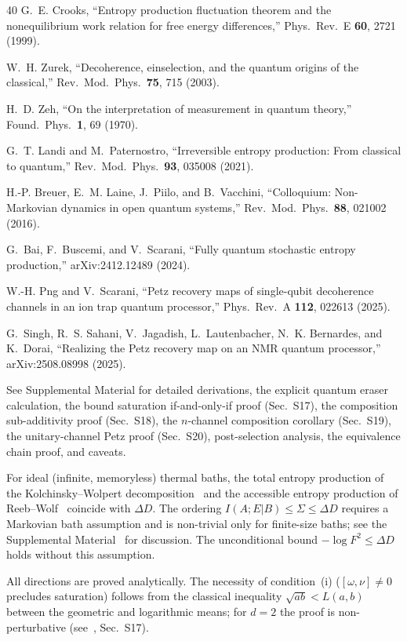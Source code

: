 \documentclass[prl,twocolumn,superscriptaddress,longbibliography,floatfix]{revtex4-2}
\begin{document}
\begin{thebibliography}{40}
G.~E. Crooks,
``Entropy production fluctuation theorem and the nonequilibrium
work relation for free energy differences,''
Phys.\ Rev.\ E \textbf{60}, 2721 (1999).

W.~H. Zurek,
``Decoherence, einselection, and the quantum origins of the
classical,''
Rev.\ Mod.\ Phys.\ \textbf{75}, 715 (2003).

H.~D. Zeh,
``On the interpretation of measurement in quantum theory,''
Found.\ Phys.\ \textbf{1}, 69 (1970).

G.~T. Landi and M.~Paternostro,
``Irreversible entropy production: From classical to quantum,''
Rev.\ Mod.\ Phys.\ \textbf{93}, 035008 (2021).

H.-P. Breuer, E.~M. Laine, J.~Piilo, and B.~Vacchini,
``Colloquium: Non-Markovian dynamics in open quantum systems,''
Rev.\ Mod.\ Phys.\ \textbf{88}, 021002 (2016).

G.~Bai, F.~Buscemi, and V.~Scarani,
``Fully quantum stochastic entropy production,''
arXiv:2412.12489 (2024).

W.-H. Png and V.~Scarani,
``Petz recovery maps of single-qubit decoherence channels in an
ion trap quantum processor,''
Phys.\ Rev.\ A \textbf{112}, 022613 (2025).

G.~Singh, R.~S. Sahani, V.~Jagadish, L.~Lautenbacher,
N.~K. Bernardes, and K.~Dorai,
``Realizing the Petz recovery map on an NMR quantum processor,''
arXiv:2508.08998 (2025).

See Supplemental Material for detailed derivations,
the explicit quantum eraser calculation, the bound saturation
if-and-only-if proof (Sec.~S17), the composition sub-additivity
proof (Sec.~S18), the $n$-channel composition corollary
(Sec.~S19), the unitary-channel Petz proof (Sec.~S20),
post-selection analysis,
the equivalence chain proof, and caveats.

For ideal (infinite, memoryless) thermal baths, the total entropy
production of the Kolchinsky--Wolpert
decomposition~\cite{Kolchinsky2017} and the accessible entropy
production of Reeb--Wolf~\cite{ReebWolf2014} coincide with
$\Delta D$.  The ordering $I(A;E|B) \leq \Sigma \leq \Delta D$
requires a Markovian bath assumption and is non-trivial only for
finite-size baths; see the Supplemental Material~\cite{SM} for
discussion.  The unconditional bound
$-\!\log F^2 \leq \Delta D$ holds without this assumption.

All directions are proved analytically.
The necessity of condition~(i) ($[\omega,\nu]\neq 0$ precludes
saturation) follows from the classical inequality
$\sqrt{ab} < L(a,b)$ between the geometric and logarithmic means;
for $d = 2$ the proof is non-perturbative
(see~\cite{SM}, Sec.~S17).

\end{thebibliography}
\end{document}

